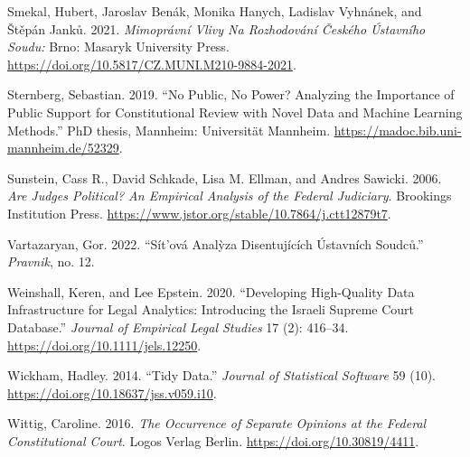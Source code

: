 \documentclass[
  11pt,
]{article}
\newlength{\cslhangindent}
\newenvironment{CSLReferences}[2] %
 {%
  \setlength{\parindent}{0pt}
  \ifodd #1 \everypar{\setlength{\hangindent}{\cslhangindent}}\ignorespaces\fi
  \ifnum #2 > 0
  \setlength{\parskip}{#2\baselineskip}
  \fi
 }%
 {}
\begin{document}
\begin{CSLReferences}{1}{0}
\leavevmode{}%
Smekal, Hubert, Jaroslav Benák, Monika Hanych, Ladislav Vyhnánek, and
Štěpán Janků. 2021. \emph{Mimoprávní Vlivy Na Rozhodování Českého
{Ústavního} Soudu:} {Brno}: {Masaryk University Press}.
\url{https://doi.org/10.5817/CZ.MUNI.M210-9884-2021}.

\leavevmode{}%
Sternberg, Sebastian. 2019. {``No Public, No Power? {Analyzing} the
Importance of Public Support for Constitutional Review with Novel Data
and Machine Learning Methods.''} PhD thesis, {Mannheim}: {Universität
Mannheim}. \url{https://madoc.bib.uni-mannheim.de/52329}.

\leavevmode{}%
Sunstein, Cass R., David Schkade, Lisa M. Ellman, and Andres Sawicki.
2006. \emph{Are {Judges Political}? {An Empirical Analysis} of the
{Federal Judiciary}}. {Brookings Institution Press}.
\url{https://www.jstor.org/stable/10.7864/j.ctt12879t7}.

\leavevmode{}%
Vartazaryan, Gor. 2022. {``Sít'ová Analỳza Disentujících Ústavních
Soudců.''} \emph{Pravnik}, no. 12.

\leavevmode{}%
Weinshall, Keren, and Lee Epstein. 2020. {``Developing {High-Quality
Data Infrastructure} for {Legal Analytics}: {Introducing} the {Israeli
Supreme Court Database}.''} \emph{Journal of Empirical Legal Studies} 17
(2): 416--34. \url{https://doi.org/10.1111/jels.12250}.

\leavevmode{}%
Wickham, Hadley. 2014. {``Tidy {Data}.''} \emph{Journal of Statistical
Software} 59 (10). \url{https://doi.org/10.18637/jss.v059.i10}.

\leavevmode{}%
Wittig, Caroline. 2016. \emph{The {Occurrence} of {Separate Opinions} at
the {Federal Constitutional Court}}. {Logos Verlag Berlin}.
\url{https://doi.org/10.30819/4411}.

\end{CSLReferences}
\end{document}
